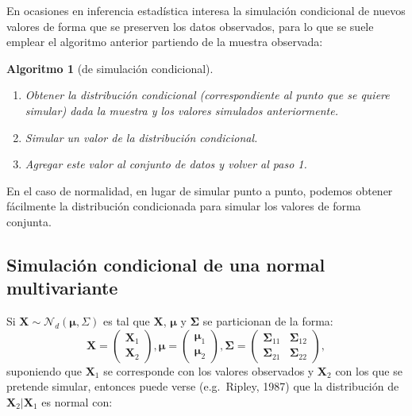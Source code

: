 \documentclass[
]{book}
\theoremstyle{break}
\newtheorem{conjecture}{Algoritmo}[chapter]
\theoremstyle{nonumberplain}
\begin{document}
En ocasiones en inferencia estadística interesa la simulación condicional de nuevos valores de forma que se preserven los datos observados, para lo que se suele emplear el algoritmo anterior partiendo de la muestra observada:

\begin{conjecture}[de simulación condicional]
\protect\hypertarget{cnj:cond-incond}{}\label{cnj:cond-incond}

\begin{enumerate}
\def\labelenumi{\arabic{enumi}.}
\item
  Obtener la distribución condicional (correspondiente al punto
  que se quiere simular) dada la muestra y los valores simulados
  anteriormente.
\item
  Simular un valor de la distribución condicional.
\item
  Agregar este valor al conjunto de datos y volver al paso 1.
\end{enumerate}

\end{conjecture}

En el caso de normalidad, en lugar de simular punto a punto,
podemos obtener fácilmente la distribución condicionada
para simular los valores de forma conjunta.

\hypertarget{condnormal}{%
\subsection{Simulación condicional de una normal multivariante}\label{condnormal}}

Si \(\mathbf{X} \sim \mathcal{N}_d\left( \boldsymbol\mu,\Sigma \right)\) es tal que \(\mathbf{X}\), \(\boldsymbol\mu\) y \(\boldsymbol\Sigma\) se particionan de la forma:
\[\mathbf{X} =
\begin{pmatrix}
 \mathbf{X}_1 \\
 \mathbf{X}_2
\end{pmatrix},  
\boldsymbol\mu =
\begin{pmatrix}
 \boldsymbol\mu_1 \\
 \boldsymbol\mu_2
\end{pmatrix}, 
\boldsymbol\Sigma =
\begin{pmatrix}
 \boldsymbol\Sigma_{11} & \boldsymbol\Sigma_{12} \\
 \boldsymbol\Sigma_{21} & \boldsymbol\Sigma_{22}
\end{pmatrix},\]
suponiendo que \(\mathbf{X}_1\) se corresponde con los valores observados y \(\mathbf{X}_2\) con los que se pretende simular,
entonces puede verse (e.g.~Ripley, 1987) que la distribución de \(\mathbf{X}_2 | \mathbf{X}_1\) es normal con:
\end{document}
